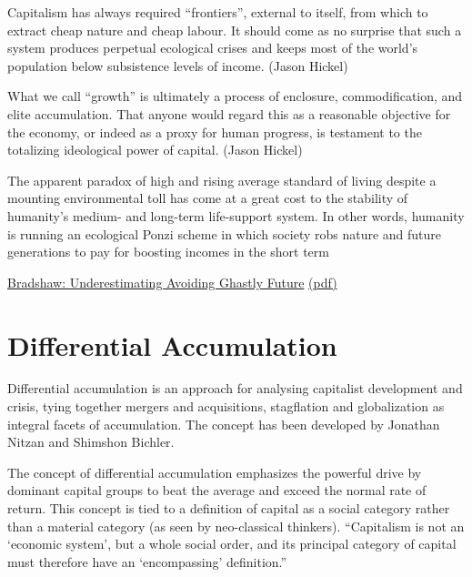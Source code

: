 \documentclass[
]{book}
\begin{document}
Capitalism has always required ``frontiers'', external to itself,
from which to extract cheap nature and cheap labour.
It should come as no surprise that such a system produces
perpetual ecological crises and keeps most of the world's
population below subsistence levels of income. (Jason Hickel)

What we call ``growth'' is ultimately a process of enclosure, commodification,
and elite accumulation.
That anyone would regard this as a reasonable objective for the economy,
or indeed as a proxy for human progress,
is testament to the totalizing ideological power of capital. (Jason Hickel)

The apparent paradox of high and rising average
standard of living despite a mounting environmental toll has
come at a great cost to the stability of humanity's medium-
and long-term life-support system. In other words, humanity is
running an ecological Ponzi scheme in which society robs nature
and future generations to pay for boosting incomes in the short
term

\href{https://www.frontiersin.org/articles/10.3389/fcosc.2020.615419/full}{Bradshaw: Underestimating Avoiding Ghastly Future}
\href{/pdf/Bradshaw_2020_Underestimating.pdf}{(pdf)}

\hypertarget{differential-accumulation}{%
\section{Differential Accumulation}\label{differential-accumulation}}

Differential accumulation is an approach for analysing capitalist development and crisis, tying together mergers and acquisitions, stagflation and globalization as integral facets of accumulation. The concept has been developed by Jonathan Nitzan and Shimshon Bichler.

The concept of differential accumulation emphasizes the powerful drive by dominant capital groups to beat the average and exceed the normal rate of return. This concept is tied to a definition of capital as a social category rather than a material category (as seen by neo-classical thinkers). ``Capitalism is not an `economic system', but a whole social order, and its principal category of capital must therefore have an `encompassing' definition.''
\end{document}
